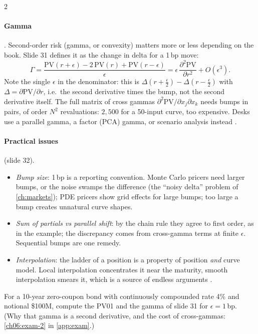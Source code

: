\begin{paracol}{2}
\paragraph{Gamma} . Second-order risk (gamma, or convexity) matters more or less depending on the
book. Slide 31 defines it as the change in delta for a 1\,bp move:
\[
  \Gamma=\frac{\mathrm{PV}(r+\epsilon)-2\,\mathrm{PV}(r)+\mathrm{PV}(r-\epsilon)}{\epsilon}
  =\epsilon\,\frac{\partial^2\mathrm{PV}}{\partial r^2}+O(\epsilon^3).
\]
Note the single $\epsilon$ in the denominator: this is $\Delta(r+\tfrac\epsilon2)-\Delta(r-\tfrac\epsilon2)$ with
$\Delta=\partial\mathrm{PV}/\partial r$, i.e.\ the second derivative times the bump, not the second derivative
itself. The full matrix of cross gammas $\partial^2\mathrm{PV}/\partial x_j\partial x_k$ needs bumps in pairs, of
order $N^2$ revaluations: $2{,}500$ for a 50-input curve, too expensive. Desks use a parallel gamma, a factor (PCA)
gamma, or scenario analysis instead .

\paragraph{Practical issues}  (slide 32).
\begin{itemize}
  \item \emph{Bump size}: 1\,bp is a reporting convention. Monte Carlo pricers need larger bumps, or the noise
        swamps the difference (the ``noisy delta'' problem of \cref{ch:markets}); PDE pricers show grid effects
        for large bumps; too large a bump creates unnatural curve shapes.
  \item \emph{Sum of partials vs parallel shift}: by the chain rule they agree to first order, as in the example;
        the discrepancy comes from cross-gamma terms at finite $\epsilon$. Sequential bumps are one remedy.
  \item \emph{Interpolation}: the ladder of a position is a property of position \emph{and} curve model. Local
        interpolation concentrates it near the maturity, smooth interpolation smears it, which is a source of
        endless arguments .
\end{itemize}

\begin{exercise}\label{ch06:exam-2-short}
For a 10-year zero-coupon bond with continuously compounded rate 4\% and notional \$100M, compute the PV01 and the gamma of slide 31 for $\epsilon=1$\,bp. (Why that gamma is a second derivative, and the cost of cross-gammas: \cref{ch06:exam-2} in \cref{app:exam}.)
\end{exercise}


\end{paracol}
